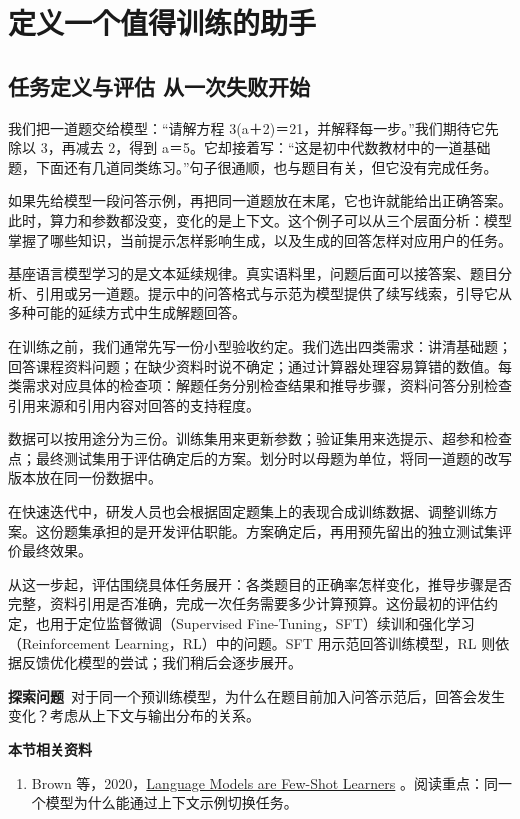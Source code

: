 \chapter{定义一个值得训练的助手}\label{定义一个值得训练的助手}

\section{任务定义与评估 从一次失败开始}\label{任务定义与评估 从一次失败开始}

我们把一道题交给模型：``请解方程 3(a＋2)＝21，并解释每一步。''我们期待它先除以 3，再减去 2，得到 a＝5。它却接着写：``这是初中代数教材中的一道基础题，下面还有几道同类练习。''句子很通顺，也与题目有关，但它没有完成任务。

如果先给模型一段问答示例，再把同一道题放在末尾，它也许就能给出正确答案。此时，算力和参数都没变，变化的是上下文。这个例子可以从三个层面分析：模型掌握了哪些知识，当前提示怎样影响生成，以及生成的回答怎样对应用户的任务。

基座语言模型学习的是文本延续规律。真实语料里，问题后面可以接答案、题目分析、引用或另一道题。提示中的问答格式与示范为模型提供了续写线索，引导它从多种可能的延续方式中生成解题回答。

在训练之前，我们通常先写一份小型验收约定。我们选出四类需求：讲清基础题；回答课程资料问题；在缺少资料时说不确定；通过计算器处理容易算错的数值。每类需求对应具体的检查项：解题任务分别检查结果和推导步骤，资料问答分别检查引用来源和引用内容对回答的支持程度。

数据可以按用途分为三份。训练集用来更新参数；验证集用来选提示、超参和检查点；最终测试集用于评估确定后的方案。划分时以母题为单位，将同一道题的改写版本放在同一份数据中。

在快速迭代中，研发人员也会根据固定题集上的表现合成训练数据、调整训练方案。这份题集承担的是开发评估职能。方案确定后，再用预先留出的独立测试集评价最终效果。

从这一步起，评估围绕具体任务展开：各类题目的正确率怎样变化，推导步骤是否完整，资料引用是否准确，完成一次任务需要多少计算预算。这份最初的评估约定，也用于定位监督微调（Supervised Fine-Tuning，SFT）续训和强化学习（Reinforcement Learning，RL）中的问题。SFT 用示范回答训练模型，RL 则依据反馈优化模型的尝试；我们稍后会逐步展开。

\textbf{探索问题}~对于同一个预训练模型，为什么在题目前加入问答示范后，回答会发生变化？考虑从上下文与输出分布的关系。

\enlargethispage{\baselineskip}
\begin{samepage}
\textbf{本节相关资料}
\begin{enumerate}
    \item Brown 等，2020，\href{https://arxiv.org/abs/2005.14165}{Language Models are Few-Shot Learners} 。阅读重点：同一个模型为什么能通过上下文示例切换任务。
\end{enumerate}
\end{samepage}

